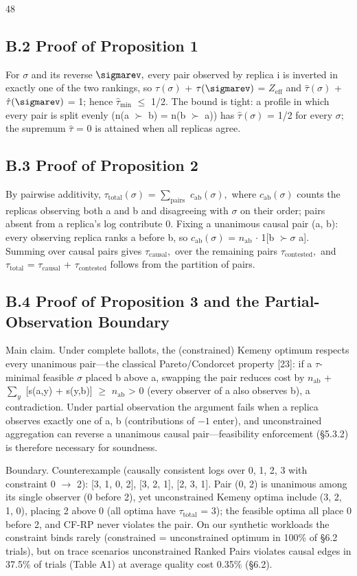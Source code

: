 \documentclass[journal]{IEEEtran}
\begin{document}
\begin{thebibliography}{48}
\subsection{B.2 Proof of Proposition 1}
For $\sigma$ and its reverse $\sigmarev,$ every pair observed by replica i is inverted in exactly one of the two rankings, so $\tau(\sigma)$ + $\tau(\sigmarev)$ = $Z_{\mathrm{eff}}$ and $\hat{\tau}(\sigma)$ + $\hat{\tau}(\sigmarev)$ = 1; hence $\hat{\tau}_{\mathrm{min}}$ $\leq$ 1/2. The bound is tight: a profile in which every pair is split evenly (n(a $\succ$ b) = n(b $\succ$ a)) has $\hat{\tau}(\sigma)$ = 1/2 for every $\sigma;$ the supremum $\hat{\tau}$ = 0 is attained when all replicas agree.

\subsection{B.3 Proof of Proposition 2}
By pairwise additivity, $\tau_{\mathrm{total}}(\sigma)$ = $\sum_{\mathrm{pairs}}$ $c_{\mathrm{ab}}(\sigma),$ where $c_{\mathrm{ab}}(\sigma)$ counts the replicas observing both a and b and disagreeing with $\sigma$ on their order; pairs absent from a replica's log contribute 0. Fixing a unanimous causal pair (a, b): every observing replica ranks a before b, so $c_{\mathrm{ab}}(\sigma)$ = $n_{\mathrm{ab}}$ $\cdot$ 1[b $\succ\sigma$ a]. Summing over causal pairs gives $\tau_{\mathrm{causal}},$ over the remaining pairs $\tau_{\mathrm{contested}},$ and $\tau_{\mathrm{total}}$ = $\tau_{\mathrm{causal}}$ + $\tau_{\mathrm{contested}}$ follows from the partition of pairs.

\subsection{B.4 Proof of Proposition 3 and the Partial-Observation Boundary}
Main claim. Under complete ballots, the (constrained) Kemeny optimum respects every unanimous pair—the classical Pareto/Condorcet property [23]: if a $\tau$-minimal feasible $\sigma$ placed b above a, swapping the pair reduces cost by $n_{\mathrm{ab}}$ + $\sum_{y}$ [s(a,y) + s(y,b)] $\geq$ $n_{\mathrm{ab}}$ > 0 (every observer of a also observes b), a contradiction. Under partial observation the argument fails when a replica observes exactly one of a, b (contributions of $-1$ enter), and unconstrained aggregation can reverse a unanimous causal pair—feasibility enforcement (§5.3.2) is therefore necessary for soundness.

Boundary. Counterexample (causally consistent logs over {0, 1, 2, 3} with constraint 0 $\rightarrow$ 2): [3, 1, 0, 2], [3, 2, 1], [2, 3, 1]. Pair (0, 2) is unanimous among its single observer (0 before 2), yet unconstrained Kemeny optima include (3, 2, 1, 0), placing 2 above 0 (all optima have $\tau_{\mathrm{total}}$ = 3); the feasible optima all place 0 before 2, and CF-RP never violates the pair. On our synthetic workloads the constraint binds rarely (constrained = unconstrained optimum in 100\% of §6.2 trials), but on trace scenarios unconstrained Ranked Pairs violates causal edges in 37.5\% of trials (Table A1) at average quality cost 0.35\% (§6.2).


\end{thebibliography}
\end{document}
